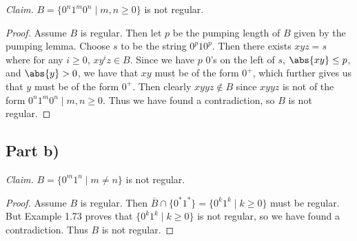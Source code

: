 \documentclass{abrice}
\newcommand{\comp}[1]{\overline{#1}}%
\begin{document}
\emph{Claim.} $B = \{0^n 1^m 0^n \mid m,n \geq 0\}$ is not regular.

\begin{proof}
  Assume $B$ is regular. Then let $p$ be the pumping length of $B$ given by the
  pumping lemma. Choose $s$ to be the string $0^p 1 0^p$. Then there exists $xyz
  = s$ where for any $i \geq 0$, $xy^iz \in B$. Since we have $p$ $0$'s on the
  left of $s$, $\abs{xy} \leq p$, and $\abs{y} > 0$, we have that $xy$ must be
  of the form $0^+$, which further gives us that $y$ must be of the form $0^+$.
  Then clearly $xyyz \notin B$ since $xyyz$ is not of the form $0^n 1^m 0^n \mid
  m,n \geq 0$. Thus we have found a contradiction, so $B$ is not regular.
\end{proof}

\subsection{Part b)}

\emph{Claim.} $B = \{0^m 1^n \mid m \neq n\}$ is not regular.

\begin{proof}
  Assume $B$ is regular. Then $\comp{B} \cap \{0^* 1^*\} = \{0^k 1^k \mid k \geq
  0\}$ must be regular. But Example 1.73 proves that $\{0^k 1^k \mid k \geq 0\}$
  is not regular, so we have found a contradiction. Thus $B$ is not regular.
\end{proof}
\end{document}
